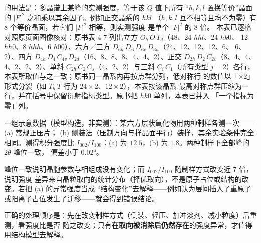  的用法是：多晶谱上某峰的实测强度，等于该 $Q$ 值下所有
“$h,k,l$ 置换等价”晶面的 $\left|F\right|^{2}$ 之和乘以其余因子。例如正交晶系的 $hkl$
（$h,k,l$ 互不相等且均不为零）有 8 个等价晶面，若它们 $\left|F\right|^{2}$ 相等，则实测强度
是单个 $\left|F\right|^{2}$ 的 8 倍。
本表已逐格对照原页面图像核对：原书表 4-7 列出立方 $O_h\,O\,T_d$（48、24 $hhl$、24 $hk0$、
12 $hh0$、8 $hhh$、6 $h00$）、六方／三方 $D_{6h}\,D_6\,D_{6v}\,D_{3h}$（24、12、12、12、6、
6、2）、四方 $D_{4h}\,D_4\,C_{4v}\,D_{2d}$（16、8、8、8、4、4、2）、正交
$D_{2h}\,D_2\,C_{2v}$（8、4、4、4、2、2、2）、单斜 $C_{2h}\,C_2\,C_s$（4、2、2）与三斜
$C_i\,C_1$（所有类型 $j=2$）各行，本表所取值与之一致；原书同一晶系内再按点群分列，低对称行
的数值以「$\times 2$」形式分裂（如 $T_h\,T$ 行为 $24\times2$、$12\times2$），本表按该晶系
最高对称点群压缩为一行，并在括号中保留衍射指标类型。原书把 $hk0$ 单列，本表已并入
「一个指标为零」列。

\begin{example}
\begin{obs}
一组示意数据（模型构造，非实测）：某六方层状氧化物用两种制样各测一次——(a) 常规正压片；
(b) 侧装法（压制方向与样品面平行）装样，其余实验条件完全相同。测得积分强度比
$I_{002}/I_{100}$：(a) 为 $12.5$，(b) 为 $1.8$。两种制样下全部峰的 $2\theta$ 峰位一致，
偏差小于 $0.02°$。
\end{obs}
\begin{infer}
峰位一致说明晶胞参数与相组成没有变化；而 $I_{002}/I_{100}$ 随制样方式改变近 7 倍，说明强度
差异来自晶粒取向的统计分布（择优取向），不是原子占位或结构的改变。若把 (a) 的异常强度当成
“结构变化”去解释——例如认为层间插入了重原子或阳离子占位发生了迁移——就会得到错误结论。
\end{infer}
正确的处理顺序是：先在改变制样方式（侧装、轻压、加冲淡剂、减小粒度）后重测，看强度比是否
随之改变；只有\textbf{在取向被消除后仍然存在}的强度异常，才值得用结构模型去解释。
\end{example}


